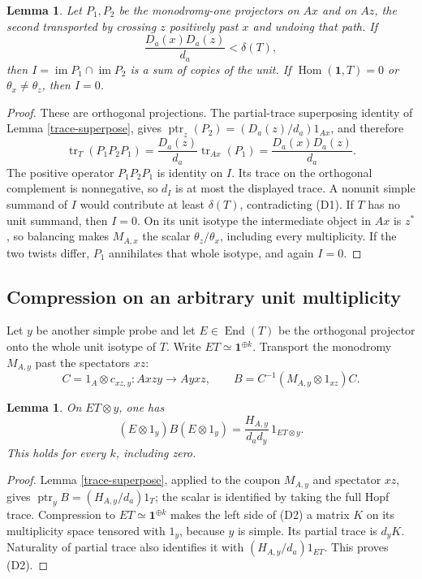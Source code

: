 \documentclass[10pt]{amsart}
\newcommand{\one}{\mathbf1}\newcommand{\C}{\mathcal C}
\newcommand{\Hom}{\operatorname{Hom}}\newcommand{\Irr}{\operatorname{Irr}}
\newcommand{\tr}{\operatorname{tr}}\newcommand{\ptr}{\operatorname{ptr}}
\newcommand{\im}{\operatorname{im}}
\newtheorem{lemma}[theorem]{Lemma}
\begin{document}
\begin{lemma}\label{dimension-gap}
Let $P_1,P_2$ be the monodromy-one projectors on $Ax$ and
on $Az$, the second transported by crossing $z$ positively
past $x$ and undoing that path. If
\[
                  \frac{D_a(x)D_a(z)}{d_a}<\delta(T),            \tag{D1}
\]
then $I=\im P_1\cap\im P_2$ is a sum of copies of the unit.
If $\Hom(\one,T)=0$ or $\theta_x\ne\theta_z$, then $I=0$.
\end{lemma}
\begin{proof}
These are orthogonal projections. The partial-trace superposing
identity of Lemma \ref{trace-superpose}, gives
$\ptr_z(P_2)=(D_a(z)/d_a)1_{Ax}$, and therefore
\[
 \tr_T(P_1P_2P_1)
 =\frac{D_a(z)}{d_a}\tr_{Ax}(P_1)
 =\frac{D_a(x)D_a(z)}{d_a}.
\]
The positive operator $P_1P_2P_1$ is identity on $I$.
Its trace on the orthogonal complement is nonnegative,
so $d_I$ is at most the displayed trace.
A nonunit simple summand of $I$ would contribute at least
$\delta(T)$, contradicting (D1). If $T$ has no unit summand,
then $I=0$. On its unit isotype the intermediate object in $Ax$
is $z^*$, so balancing makes $M_{A,x}$ the scalar
$\theta_z/\theta_x$, including every multiplicity.
If the two twists differ, $P_1$ annihilates that whole isotype,
and again $I=0$.
\end{proof}

\subsection{Compression on an arbitrary unit multiplicity}
Let $y$ be another simple probe and let $E\in\operatorname{End}(T)$
be the orthogonal projector onto the whole unit isotype of $T$.
Write $ET\simeq\one^{\oplus k}$. Transport the monodromy $M_{A,y}$
past the spectators $xz$:
\[
 C=1_A\otimes c_{xz,y}:Axzy\longrightarrow Ayxz,\qquad
 B=C^{-1}(M_{A,y}\otimes1_{xz})C.
\]
\begin{lemma}\label{meridian-compression}
On $ET\otimes y$, one has
\[
           (E\otimes1_y)B(E\otimes1_y)
       =\frac{H_{A,y}}{d_a d_y}\,1_{ET\otimes y}.                \tag{D2}
\]
This holds for every $k$, including zero.
\end{lemma}
\begin{proof}
Lemma \ref{trace-superpose}, applied to the coupon $M_{A,y}$ and
spectator $xz$, gives
$\ptr_y B=(H_{A,y}/d_a)1_T$; the scalar is identified by
taking the full Hopf trace.
Compression to $ET\simeq\one^{\oplus k}$ makes the left side
of (D2) a matrix $K$ on its multiplicity space tensored with
$1_y$, because $y$ is simple. Its partial trace is $d_yK$.
Naturality of partial trace also identifies it with
$(H_{A,y}/d_a)1_{ET}$. This proves (D2).
\end{proof}
\end{document}
